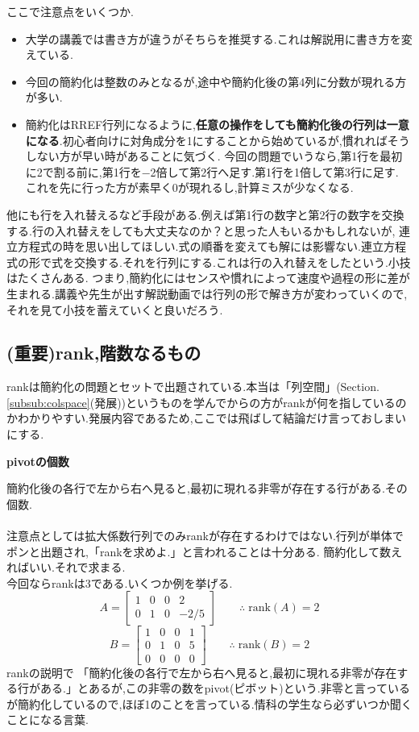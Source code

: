 ここで注意点をいくつか.
\begin{itemize}
    \item 大学の講義では書き方が違うがそちらを推奨する.これは解説用に書き方を変えている.
    \item 今回の簡約化は整数のみとなるが,途中や簡約化後の第4列に分数が現れる方が多い.
    \item 簡約化はRREF行列になるように,\textbf{任意の操作をしても簡約化後の行列は一意になる}.初心者向けに対角成分を1にすることから始めているが,慣れればそうしない方が早い時があることに気づく.
    今回の問題でいうなら,第1行を最初に2で割る前に,第1行を−2倍して第2行へ足す.第1行を1倍して第3行に足す.
    これを先に行った方が素早く0が現れるし,計算ミスが少なくなる.
\end{itemize}
\hspace{1em}
他にも行を入れ替えるなど手段がある.例えば第1行の数字と第2行の数字を交換する.行の入れ替えをしても大丈夫なのか？と思った人もいるかもしれないが,
連立方程式の時を思い出してほしい.式の順番を変えても解には影響ない.連立方程式の形で式を交換する.それを行列にする.これは行の入れ替えをしたという.小技はたくさんある.
つまり,簡約化にはセンスや慣れによって速度や過程の形に差が生まれる.講義や先生が出す解説動画では行列の形で解き方が変わっていくので,
それを見て小技を蓄えていくと良いだろう.
\subsection{(重要)rank,階数なるもの}
rankは簡約化の問題とセットで出題されている.本当は「列空間」(Section.\ref{subsub:colspace}(発展))というものを学んでからの方がrankが何を指しているのかわかりやすい.発展内容であるため,ここでは飛ばして結論だけ言っておしまいにする.
\begin{tcolorbox}[colframe=black!80,colback=white,title=rankとpivotの関係]
\begin{center}
    \textbf{pivotの個数}
\end{center}
\begin{framed}
簡約化後の各行で左から右へ見ると,最初に現れる非零が存在する行がある.その個数.\\\\
注意点としては拡大係数行列でのみrankが存在するわけではない.行列が単体でポンと出題され,「rankを求めよ.」と言われることは十分ある.
簡約化して数えればいい.それで求まる.
\\
今回ならrankは3である.いくつか例を挙げる.
\[
A=
\begin{bmatrix}
    1 & 0 & 0 & 2 \\
    0 & 1 & 0 & -2/5
\end{bmatrix} \qquad
\therefore \;\text{rank}(A) = 2
\]
\[
B=
\begin{bmatrix}
    1 & 0 & 0 & 1 \\
    0 & 1 & 0 & 5 \\
    0 & 0 & 0 & 0
\end{bmatrix} \qquad
\therefore \;\text{rank}(B) = 2
\]
rankの説明で
「簡約化後の各行で左から右へ見ると,最初に現れる非零が存在する行がある.」とあるが,この非零の数をpivot(ピボット)という.非零と言っているが簡約化しているので,ほぼ1のことを言っている.情科の学生なら必ずいつか聞くことになる言葉.
\end{framed}
\end{tcolorbox}

